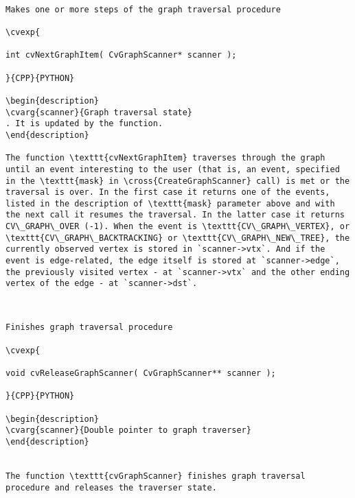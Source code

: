 \begin{verbatim}

Makes one or more steps of the graph traversal procedure

\cvexp{

int cvNextGraphItem( CvGraphScanner* scanner );

}{CPP}{PYTHON}

\begin{description}
\cvarg{scanner}{Graph traversal state}
. It is updated by the function.
\end{description}

The function \texttt{cvNextGraphItem} traverses through the graph until an event interesting to the user (that is, an event, specified in the \texttt{mask} in \cross{CreateGraphScanner} call) is met or the traversal is over. In the first case it returns one of the events, listed in the description of \texttt{mask} parameter above and with the next call it resumes the traversal. In the latter case it returns CV\_GRAPH\_OVER (-1). When the event is \texttt{CV\_GRAPH\_VERTEX}, or \texttt{CV\_GRAPH\_BACKTRACKING} or \texttt{CV\_GRAPH\_NEW\_TREE}, the currently observed vertex is stored in `scanner->vtx`. And if the event is edge-related, the edge itself is stored at `scanner->edge`, the previously visited vertex - at `scanner->vtx` and the other ending vertex of the edge - at `scanner->dst`.


\end{verbatim}
\begin{verbatim}

Finishes graph traversal procedure

\cvexp{

void cvReleaseGraphScanner( CvGraphScanner** scanner );

}{CPP}{PYTHON}

\begin{description}
\cvarg{scanner}{Double pointer to graph traverser}
\end{description}


The function \texttt{cvGraphScanner} finishes graph traversal procedure and releases the traverser state.


\end{verbatim}
